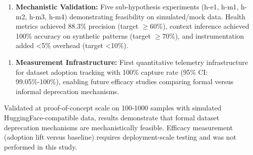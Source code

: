 \begin{enumerate}
\item \textbf{Mechanistic Validation:} Five sub-hypothesis experiments (h-e1, h-m1, h-m2, h-m3, h-m4) demonstrating feasibility on simulated/mock data. Health metrics achieved 88.3\% precision (target $\geq 60$\%), context inference achieved 100\% accuracy on synthetic patterns (target $\geq 70$\%), and instrumentation added <5\% overhead (target <10\%).
\end{enumerate}

\begin{enumerate}
\item \textbf{Measurement Infrastructure:} First quantitative telemetry infrastructure for dataset adoption tracking with 100\% capture rate (95\% CI: 99.05\%-100\%), enabling future efficacy studies comparing formal versus informal deprecation mechanisms.
\end{enumerate}

Validated at proof-of-concept scale on 100-1000 samples with simulated HuggingFace-compatible data, results demonstrate that formal dataset deprecation mechanisms are mechanistically feasible. Efficacy measurement (adoption lift versus baseline) requires deployment-scale testing and was not performed in this study.
